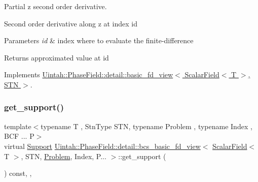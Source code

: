 Partial z second order derivative. 

Second order derivative along z at index id


\begin{DoxyParams}{Parameters}
{\em id} & index where to evaluate the finite-\/difference \\
\hline
\end{DoxyParams}
\begin{DoxyReturn}{Returns}
approximated value at id 
\end{DoxyReturn}


Implements \hyperlink{classUintah_1_1PhaseField_1_1detail_1_1basic__fd__view_3_01ScalarField_3_01T_01_4_00_01STN_01_4_a6a9141dd1b9b547eba1bd7ff0440b6bf}{Uintah\+::\+Phase\+Field\+::detail\+::basic\+\_\+fd\+\_\+view$<$ Scalar\+Field$<$ T $>$, S\+T\+N $>$}.

\mbox{\label{classUintah_1_1PhaseField_1_1detail_1_1bcs__basic__fd__view_3_01ScalarField_3_01T_01_4_00_01STN_07caa9955adf783da0505eac75e76f08_a64c502e452847bd6bbfa26e6584bd64b}} 
\subsubsection{\texorpdfstring{get\+\_\+support()}{get\_support()}}
{\footnotesize\ttfamily template$<$typename T , Stn\+Type S\+TN, typename Problem , typename Index , B\+C\+F ... P$>$ \\
virtual \hyperlink{classUintah_1_1PhaseField_1_1Support}{Support} \hyperlink{classUintah_1_1PhaseField_1_1detail_1_1bcs__basic__fd__view}{Uintah\+::\+Phase\+Field\+::detail\+::bcs\+\_\+basic\+\_\+fd\+\_\+view}$<$ \hyperlink{structUintah_1_1PhaseField_1_1ScalarField}{Scalar\+Field}$<$ T $>$, S\+TN, \hyperlink{classUintah_1_1PhaseField_1_1Problem}{Problem}, Index, P... $>$\+::get\+\_\+support (\begin{DoxyParamCaption}{ }\end{DoxyParamCaption}) const\hspace{0.3cm}{\ttfamily [inline]}, {\ttfamily [override]}, {\ttfamily [virtual]}}



